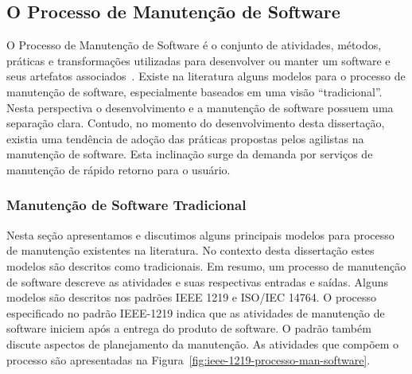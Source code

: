 
\subsection{O Processo de Manutenção de Software}
\label{sec:o_processo_de_manutecao_de_software}

O Processo de Manutenção de Software é o conjunto de atividades, métodos,
práticas e transformações utilizadas para desenvolver ou manter um software e
seus artefatos associados~\cite{paulk1993key}. Existe na literatura alguns
modelos para o processo de manutenção de software, especialmente baseados em uma
visão ``tradicional''. Nesta perspectiva o desenvolvimento e a manutenção de
software possuem uma separação clara. Contudo, no momento do desenvolvimento
desta dissertação, existia uma tendência de adoção das práticas propostas pelos
agilistas na manutenção de software. Esta inclinação surge da demanda por
serviços de manutenção de rápido retorno para o usuário.


\subsubsection{Manutenção de Software Tradicional}
\label{subsec:manutenção_de_software_tradicional}

Nesta seção apresentamos e discutimos alguns principais modelos para processo de
manutenção existentes na literatura. No contexto desta dissertação estes modelos
são descritos como tradicionais. Em resumo, um processo de manutenção de
software descreve as atividades e suas respectivas entradas e saídas. Alguns
modelos são descritos nos padrões IEEE 1219 e ISO/IEC 14764. O processo
especificado no padrão IEEE\@-\@1219 indica que as atividades de manutenção de
software iniciem após a entrega do produto de software. O padrão também discute
aspectos de planejamento da manutenção. As atividades que compõem o processo são
apresentadas na Figura~\ref{fig:ieee-1219-processo-man-software}.

